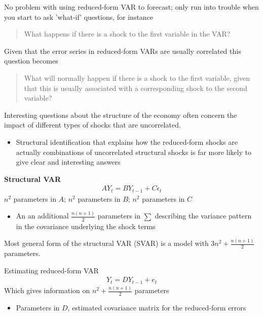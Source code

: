\documentclass{beamer}
\begin{document}
\begin{frame}
  No problem with using reduced-form VAR to forecast; only run into trouble when you start to ask 'what-if' questions, for instance
  \begin{quote}
    What happens if there is a shock to the first variable in the VAR?  
  \end{quote}
   Given that the error series in reduced-form VARs are usually correlated this question becomes
  \begin{quote}
    What will normally happen if there is a shock to the first variable, given that this is usually associated with a corresponding shock to the second variable?    
  \end{quote}
  \medskip
  Interesting questions about the structure of the economy often concern the impact of different types of shocks that are uncorrelated.
  \begin{itemize}
    \item Structural identification that explains how the reduced-form shocks are actually combinations of uncorrelated structural shocks is far more likely to give clear and interesting answers
  \end{itemize}
\end{frame}

\begin{frame}
  \textbf{Structural VAR}
  \begin{align}  
  AY_t = BY_{t-1} + C\epsilon_t 
  \end{align}
  \medskip
  $n^2$ parameters in $A$; $n^2$ parameters in $B$; $n^2$ parameters in $C$
  \begin{itemize}
    \item An an additional $\frac{n(n+1)}{2}$ parameters in $\sum$ describing the variance pattern in the covariance underlying the shock terms
\end{itemize}
  \medskip
  Most general form of the structural VAR (SVAR) is a model with $3n^2 + \frac{n(n+1)}{2}$ parameters.
\end{frame}

\begin{frame}
  Estimating reduced-form VAR
  \begin{align}  
  Y_t = DY_{t-1} + e_t 
  \end{align}
  \medskip
  Which gives information on $n^2+\frac{n(n+1)}{2}$ parameters
  \begin{itemize}
    \item Parameters in $D$, estimated covariance matrix for the reduced-form errors
  \end{itemize}  
  
\end{frame}
\end{document}
